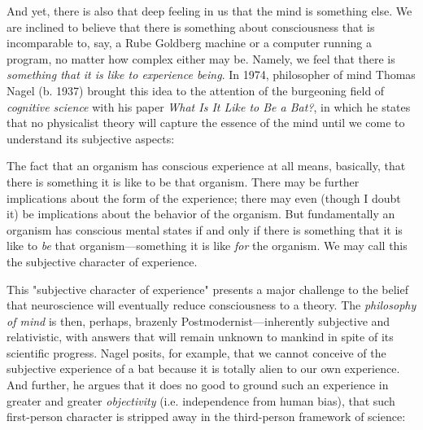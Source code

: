 And yet, there is also that deep feeling in us that the mind is something else. We are inclined to believe that there is something about consciousness that is incomparable to, say, a Rube Goldberg machine or a computer running a program, no matter how complex either may be. Namely, we feel that there is \textit{something that it is like to experience being}. In 1974, philosopher of mind Thomas Nagel (b. 1937) brought this idea to the attention of the burgeoning field of \textit{cognitive science} with his paper \textit{What Is It Like to Be a Bat?}, in which he states that no physicalist theory will capture the essence of the mind until we come to understand its subjective aspects: \\
        
\begin{displayquote}
    The fact that an organism has conscious experience at all means, basically, that there is something it is like to be that organism. There may be further implications about the form of the experience; there may even (though I doubt it) be implications about the behavior of the organism. But fundamentally an organism has conscious mental states if and only if there is something that it is like to \textit{be} that organism---something it is like \textit{for} the organism. We may call this the subjective character of experience. \\
\end{displayquote}
        
This "subjective character of experience" presents a major challenge to the belief that neuroscience will eventually reduce consciousness to a theory. The \textit{philosophy of mind} is then, perhaps, brazenly Postmodernist---inherently subjective and relativistic, with answers that will remain unknown to mankind in spite of its scientific progress. Nagel posits, for example, that we cannot conceive of the subjective experience of a bat because it is totally alien to our own experience. And further, he argues that it does no good to ground such an experience in greater and greater \textit{objectivity} (i.e. independence from human bias), that such first-person character is stripped away in the third-person framework of science: \\
        
